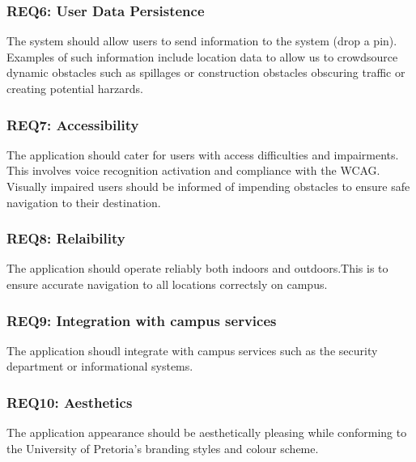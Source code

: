 \documentclass{article}
\begin{document}
		\subsubsection{REQ6: User Data Persistence}
			The system should allow users to send information to the system (drop a pin). Examples of such information include location data to allow us to crowdsource dynamic obstacles such as spillages or construction obstacles obscuring traffic or creating potential harzards.%
			
		\subsubsection{REQ7: Accessibility}
			The application should cater for users with access difficulties and impairments. This involves voice recognition activation and compliance with the WCAG.
			Visually impaired users should be informed of impending obstacles to ensure safe navigation to their destination.

		\subsubsection{REQ8: Relaibility}
			The application should operate reliably both indoors and outdoors.This is to ensure accurate navigation to all locations correctsly on campus.
			
		\subsubsection{REQ9: Integration with campus services}
			The application shoudl integrate with campus services such as the security department or informational systems.
			
		\subsubsection{REQ10: Aesthetics}
			The application appearance should be aesthetically pleasing while conforming to the University of Pretoria's branding styles and colour scheme.
%			
%			
\end{document}
